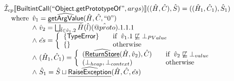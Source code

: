 \[
\begin{array}{l}
\aI _{cp}\lbr \SF{BuiltintCall}(``\SF{Object.getPrototypeOf}",args)\rbr((\hat{H},\hat{C}), \hat{S})
  = ((\hat{H}_1, \hat{C}_1), \hat{S}_1)\\
\quad\wherec{
  \hat{v}_1 =\ahf{getArgValue}(\hat{H}, \hat{C}, ``0")\\
  \land\ \hat{v}_2 = \bigsqcup_{\hat{l} \in \hat{v}_1.2} \hat{H}(\hat{l})(\hat{@proto}).1.1.1\\
  \land\ \hat{es} =
    \left\{
    \begin{array}{l@{\quad\quad}l}
      \{ \SF{TypeError} \} & \ifc{\hat{v}_1.1 \not\sqsubseteq \bot_{PValue}}\\
      \{ \}& \owc\\
    \end{array}
    \right.\\
  \land\ (\hat{H}_1, \hat{C}_1) = 
    \left\{\begin{array}{l@{\quad\quad}l}
      (\ahf{ReturnStore}(\hat{H},\hat{v}_2), \hat{C})
      & \ifc{\hat{v}_2 \not\sqsubseteq \bot_{value}}\\
      (\bot_{heap}, \bot_{context}) & \owc \\
    \end{array}\right.\\
  \land\ \hat{S}_1 = \hat{S} \sqcup \ahf{RaiseException}(\hat{H}, \hat{C}, \hat{es})\\
  }\\
\\\\  




\end{array}\]
